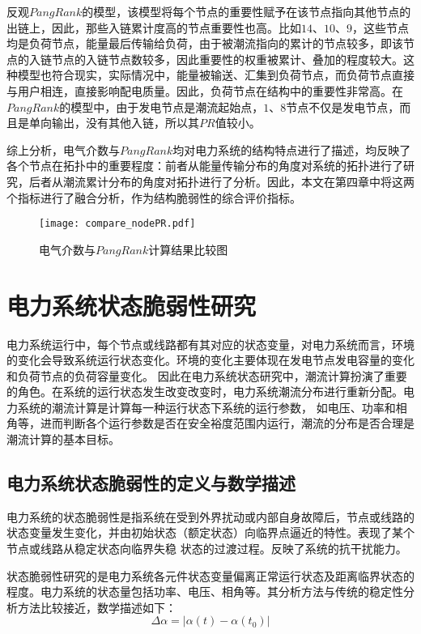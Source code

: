 反观$PangRank$的模型，该模型将每个节点的重要性赋予在该节点指向其他节点的出链上，因此，那些入链累计度高的节点重要性也高。比如$14$、$10$、$9$，这些节点均是负荷节点，能量最后传输给负荷，由于被潮流指向的累计的节点较多，即该节点的入链节点的入链节点数较多，因此重要性的权重被累计、叠加的程度较大。这种模型也符合现实，实际情况中，能量被输送、汇集到负荷节点，而负荷节点直接与用户相连，直接影响配电质量。因此，负荷节点在结构中的重要性非常高。在$PangRank$的模型中，由于发电节点是潮流起始点，$1$、$8$节点不仅是发电节点，而且是单向输出，没有其他入链，所以其$PR$值较小。

综上分析，电气介数与$PangRank$均对电力系统的结构特点进行了描述，均反映了各个节点在拓扑中的重要程度：前者从能量传输分布的角度对系统的拓扑进行了研究，后者从潮流累计分布的角度对拓扑进行了分析。因此，本文在第四章中将这两个指标进行了融合分析，作为结构脆弱性的综合评价指标。

\begin{figure}[H] %
  \centering
  \texttt{[image: compare\_nodePR.pdf]}
  \caption{电气介数与$PangRank$计算结果比较图}
  \label{fig:compare_nodePR}
\end{figure}

\section{电力系统状态脆弱性研究}
\label{sec:status}

电力系统运行中，每个节点或线路都有其对应的状态变量，对电力系统而言，环境的变化会导致系统运行状态变化。环境的变化主要体现在发电节点发电容量的变化和负荷节点的负荷容量变化。
因此在电力系统状态研究中，潮流计算扮演了重要的角色。在系统的运行状态发生改变改变时，电力系统潮流分布进行重新分配。电力系统的潮流计算是计算每一种运行状态下系统的运行参数，
如电压、功率和相角等，进而判断各个运行参数是否在安全裕度范围内运行，潮流的分布是否合理是潮流计算的基本目标。


\subsection{电力系统状态脆弱性的定义与数学描述}
\label{sec:vulneStaus}

电力系统的状态脆弱性是指系统在受到外界扰动或内部自身故障后，节点或线路的状态变量发生变化，并由初始状态（额定状态）向临界点逼近的特性。表现了某个节点或线路从稳定状态向临界失稳
状态的过渡过程。反映了系统的抗干扰能力。

状态脆弱性研究的是电力系统各元件状态变量偏离正常运行状态及距离临界状态的程度。电力系统的状态量包括功率、电压、相角等。其分析方法与传统的稳定性分析方法比较接近，数学描述如下：
\begin{equation}
\Delta \alpha=\left|\alpha(t)-\alpha\left(t_{0}\right)\right|  
\end{equation}

